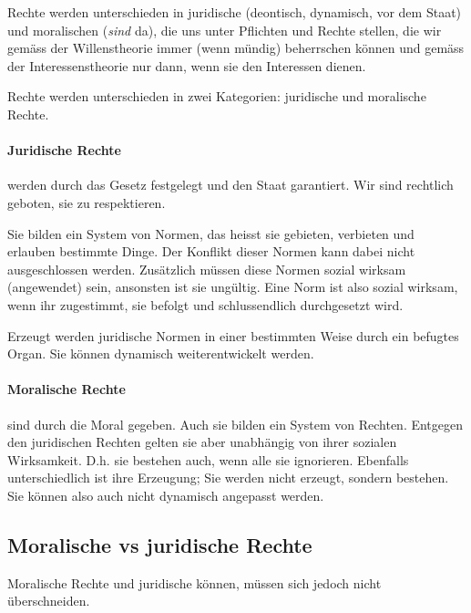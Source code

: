\documentclass[../main.tex]{subfiles}
\begin{document}
\begin{warningbox}
Rechte werden unterschieden in juridische (deontisch, dynamisch, vor dem Staat) und moralischen (\textit{sind} da), die uns unter Pflichten und Rechte stellen, die wir gemäss der Willenstheorie immer (wenn mündig) beherrschen können und gemäss der Interessenstheorie nur dann, wenn sie den Interessen dienen. 
\end{warningbox}

 
Rechte werden unterschieden in zwei Kategorien: juridische und moralische Rechte.
 
\paragraph{Juridische Rechte} werden durch das Gesetz festgelegt und den Staat garantiert. Wir sind rechtlich geboten, sie zu respektieren. 
 
Sie bilden ein System von Normen, das heisst sie gebieten, verbieten und erlauben bestimmte Dinge. Der Konflikt dieser Normen kann dabei nicht ausgeschlossen werden. Zusätzlich müssen diese Normen sozial wirksam (angewendet) sein, ansonsten ist sie ungültig. Eine Norm ist also sozial wirksam, wenn ihr zugestimmt, sie befolgt und schlussendlich durchgesetzt wird.
 
Erzeugt werden juridische Normen in einer bestimmten Weise durch ein befugtes Organ. Sie können dynamisch weiterentwickelt werden. 
 
\paragraph{Moralische Rechte} sind durch die Moral gegeben. Auch sie bilden ein System von Rechten. Entgegen den juridischen Rechten gelten sie aber unabhängig von ihrer sozialen Wirksamkeit. D.h. sie bestehen auch, wenn alle sie ignorieren. Ebenfalls unterschiedlich ist ihre Erzeugung; Sie werden nicht erzeugt, sondern bestehen. Sie können also auch nicht dynamisch angepasst werden. 
 
\subsection{Moralische vs juridische Rechte}
 Moralische Rechte und juridische können, müssen sich jedoch nicht überschneiden. 
 
\end{document}

